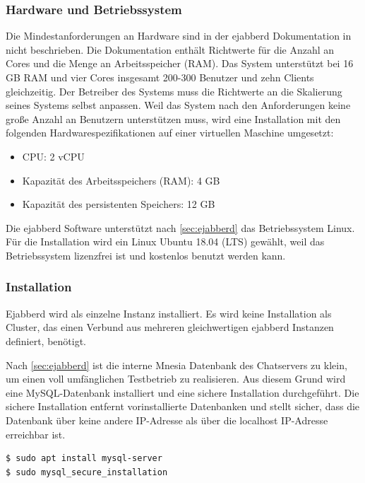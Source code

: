 \documentclass[a4paper,titlepage,halfparskip,12pt]{scrreprt}
\begin{document}
\begin{onehalfspacing}
\subsubsection*{Hardware und Betriebssystem}

Die Mindestanforderungen an Hardware sind in der ejabberd Dokumentation in \cite{ejabberdDocGettingStarted} nicht beschrieben. Die Dokumentation enthält Richtwerte für die Anzahl an Cores und die Menge an Arbeitsspeicher (RAM). Das System unterstützt bei 16 GB RAM und vier Cores insgesamt 200-300 Benutzer und zehn Clients gleichzeitig. Der Betreiber des Systems muss die Richtwerte an die Skalierung seines Systems selbst anpassen. Weil das System nach den Anforderungen keine große Anzahl an Benutzern unterstützen muss, wird eine Installation mit den folgenden Hardwarespezifikationen auf einer virtuellen Maschine umgesetzt:

\begin{itemize}
\item CPU: 2 vCPU
\item Kapazität des Arbeitsspeichers (RAM): 4 GB
\item Kapazität des persistenten Speichers: 12 GB
\end{itemize}

Die ejabberd Software unterstützt nach \autoref{sec:ejabberd} das Betriebssystem Linux. Für die Installation wird ein Linux Ubuntu 18.04 (LTS) gewählt, weil das Betriebssystem lizenzfrei ist und kostenlos benutzt werden kann.

\subsubsection*{Installation}

Ejabberd wird als einzelne Instanz installiert. Es wird keine Installation als Cluster, das einen Verbund aus mehreren gleichwertigen ejabberd Instanzen definiert, benötigt.

Nach \autoref{sec:ejabberd} ist die interne Mnesia Datenbank des Chatservers zu klein, um einen voll umfänglichen Testbetrieb zu realisieren. Aus diesem Grund wird eine MySQL-Datenbank installiert und eine sichere Installation durchgeführt. Die sichere Installation entfernt vorinstallierte Datenbanken und stellt sicher, dass die Datenbank über keine andere IP-Adresse als über die localhost IP-Adresse erreichbar ist.

\bigskip

\begin{lstlisting}[language=bash, caption={Installation der Mysql-Datenbank}]
$ sudo apt install mysql-server
$ sudo mysql_secure_installation
\end{lstlisting}


\end{onehalfspacing}
\end{document}
